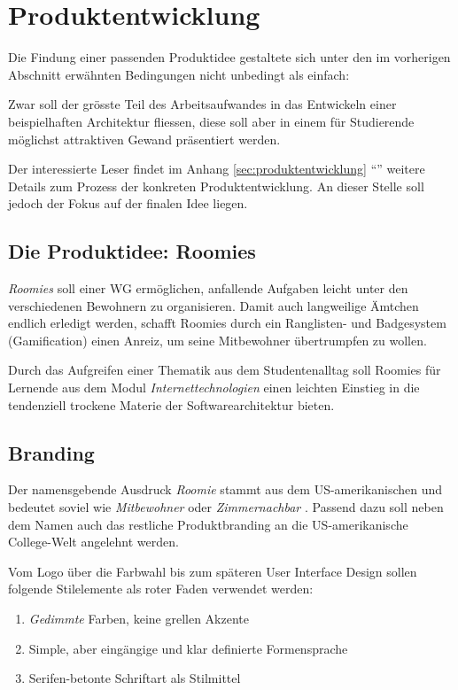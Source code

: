 \section{Produktentwicklung}
\label{sec:produktentwicklungeinleitung}
Die Findung einer passenden Produktidee gestaltete sich unter den im vorherigen Abschnitt erwähnten Bedingungen nicht unbedingt als einfach:

Zwar soll der grösste Teil des Arbeitsaufwandes in das Entwickeln einer beispielhaften Architektur fliessen, diese soll aber in einem für Studierende möglichst attraktiven Gewand präsentiert werden.

Der interessierte Leser findet im Anhang \ref{sec:produktentwicklung} ``'' weitere Details zum Prozess der konkreten Produktentwicklung. An dieser Stelle soll jedoch der Fokus auf der finalen Idee liegen.


\subsection{Die Produktidee: Roomies}
\emph{Roomies} soll einer \gls{WG} ermöglichen, anfallende Aufgaben leicht unter den verschiedenen Bewohnern zu organisieren. Damit auch langweilige Ämtchen endlich erledigt werden, schafft Roomies durch ein Ranglisten- und Badgesystem (\gls{Gamification}) einen Anreiz, um seine Mitbewohner übertrumpfen zu wollen.

Durch das Aufgreifen einer Thematik aus dem Studentenalltag soll Roomies für Lernende aus dem Modul \emph{Internettechnologien} einen leichten Einstieg in die tendenziell trockene Materie der Softwarearchitektur bieten.

\subsection{Branding}
Der namensgebende Ausdruck \emph{Roomie} stammt aus dem US-amerikanischen und bedeutet soviel wie \emph{Mitbewohner} oder \emph{Zimmernachbar} \cite{Roomie}. Passend dazu soll neben dem Namen auch das restliche Produktbranding an die US-amerikanische College-Welt angelehnt werden.

Vom Logo über die Farbwahl bis zum späteren User Interface Design sollen folgende Stilelemente als roter Faden verwendet werden:

\begin{enumerate}
	\item \emph{Gedimmte} Farben, keine grellen Akzente
	\item Simple, aber eingängige und klar definierte Formensprache
	\item Serifen-betonte Schriftart als Stilmittel
\end{enumerate}

